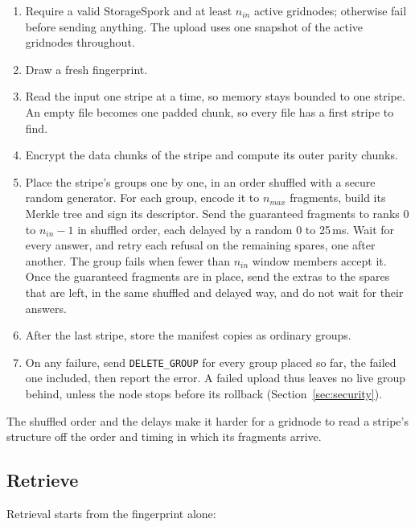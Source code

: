\documentclass[10pt,a4paper,final]{article}
\newcommand{\code}[1]{\texttt{#1}}
\begin{document}
\begin{enumerate}
	\item Require a valid StorageSpork and at least $n_{in}$ active gridnodes; otherwise fail before sending anything.
	      The upload uses one snapshot of the active gridnodes throughout.
	\item Draw a fresh fingerprint.
	\item Read the input one stripe at a time, so memory stays bounded to one stripe. An empty file becomes one
	      padded chunk, so every file has a first stripe to find.
	\item Encrypt the data chunks of the stripe and compute its outer parity chunks.
	\item Place the stripe's groups one by one, in an order shuffled with a secure random generator. For each group,
	      encode it to $n_{max}$ fragments, build its Merkle tree and sign its descriptor. Send the guaranteed
	      fragments to ranks $0$ to $n_{in} - 1$ in shuffled order, each delayed by a random 0 to 25\,ms. Wait for
	      every answer, and retry each refusal on the remaining spares, one after another. The group fails when fewer
	      than $n_{in}$ window members accept it. Once the guaranteed fragments are in place, send the extras to the
	      spares that are left, in the same shuffled and delayed way, and do not wait for their answers.
	\item After the last stripe, store the manifest copies as ordinary groups.
	\item On any failure, send \code{DELETE\_GROUP} for every group placed so far, the failed one included, then
	      report the error. A failed upload thus leaves no live group behind, unless the node stops before its
	      rollback (Section~\ref{sec:security}).
\end{enumerate}

The shuffled order and the delays make it harder for a gridnode to read a stripe's structure off the order and
timing in which its fragments arrive.

\subsection{Retrieve}

Retrieval starts from the fingerprint alone:
\end{document}
